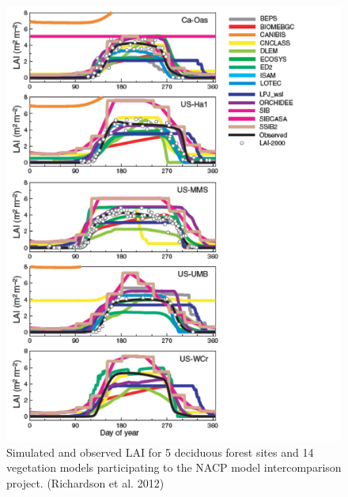 \documentclass[12pt,oneside]{book}
\begin{document}
\begin{figure}

{\centering \includegraphics[width=0.8\linewidth]{figures/chap4/f47_LAI_richardson} 

}

\caption{Simulated and observed LAI for 5 deciduous forest sites and 14 vegetation models participating to the NACP model intercomparison project. (Richardson et al. 2012)}\label{fig:f47}
\end{figure}
\end{document}
